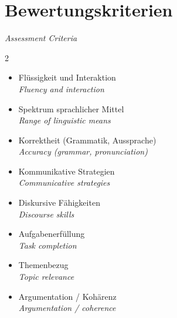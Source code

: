 \documentclass[11pt,a4paper]{article}
\newcommand{\bisection}[2]{%
    \section{#1}%
    {\small\color{englishgray}\textit{#2}}\par\vspace{6pt}%
}
\begin{document}
\bisection{Bewertungskriterien}{Assessment Criteria}

\begin{center}
\end{center}

\begin{multicols}{2}
\begin{infobox}
\begin{itemize}[leftmargin=*]
\item Flüssigkeit und Interaktion\\ {\color{englishgray}\textit{Fluency and interaction}}
\item Spektrum sprachlicher Mittel\\ {\color{englishgray}\textit{Range of linguistic means}}
\item Korrektheit (Grammatik, Aussprache)\\ {\color{englishgray}\textit{Accuracy (grammar, pronunciation)}}
\item Kommunikative Strategien\\ {\color{englishgray}\textit{Communicative strategies}}
\item Diskursive Fähigkeiten\\ {\color{englishgray}\textit{Discourse skills}}
\end{itemize}
\end{infobox}

\columnbreak

\begin{infobox}
\begin{itemize}[leftmargin=*]
\item Aufgabenerfüllung\\ {\color{englishgray}\textit{Task completion}}
\item Themenbezug\\ {\color{englishgray}\textit{Topic relevance}}
\item Argumentation / Kohärenz\\ {\color{englishgray}\textit{Argumentation / coherence}}
\end{itemize}
\vspace{1.5cm}
\end{infobox}
\end{multicols}
\end{document}
